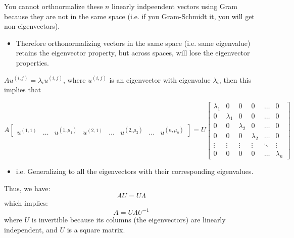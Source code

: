 \begin{warning}
    You cannot orthnormalize these $n$ linearly indpeendent vectors using Gram because they are not in the same space (i.e. if you Gram-Schmidt it, you will get non-eigenvectors).
    \begin{itemize}
        \item Therefore orthonormalizing vectors in the same space (i.e. same eigenvalue) retains the eigenvector property, but across spaces, will lose the eigenvector properties. 
    \end{itemize}
\end{warning}

\begin{derivation}
    $A u^{(i,j)} = \lambda_i u^{(i,j)}$, where $u^{(i,j)}$ is an eigenvector with eigenvalue $\lambda_i$, then this implies that

    \[
    A \begin{bmatrix}
    u^{(1,1)} & \dots & u^{(1,\mu_1)} & u^{(2,1)} & \dots & u^{(2,\mu_2)} & \dots & u^{(n,\mu_n)}
    \end{bmatrix}
    = U
    \begin{bmatrix}
        \lambda_1 & 0 & 0 & 0 & \dots & 0 \\
        0 & \lambda_1 & 0 & 0 & \dots & 0 \\
        0 & 0 & \lambda_2 & 0 & \dots & 0 \\
        0 & 0 & 0 & \lambda_2 & \dots & 0 \\
        \vdots & \vdots & \vdots & \vdots & \ddots & \vdots \\
        0 & 0 & 0 & 0 & \dots & \lambda_n
        \end{bmatrix}
    \]
    \begin{itemize}
        \item i.e. Generalizing to all the eigenvectors with their corresponding eigenvalues. 
    \end{itemize}
    \vspace{1em}

    Thus, we have:
    \[
    A U = U \Lambda
    \]
    which implies:
    \[
    A = U \Lambda U^{-1}
    \]
    where \( U \) is invertible because its columns (the eigenvectors) are linearly independent, and \( U \) is a square matrix.
\end{derivation}

